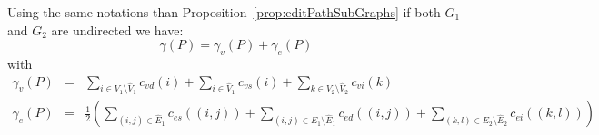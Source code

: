 \begin{remarque}\label{rem:doubleCounting}
  Using the same notations than
  Proposition~\ref{prop:editPathSubGraphs} if both $G_1$ and $G_2$ are
  undirected we have:
  \[
  \gamma(P)=\gamma_v(P)+\gamma_e(P)
  \]
  with
  \begin{equation*}
    \begin{array}{lcl}
      \gamma_v(P) & = & \displaystyle   \sum_{i\in V_1\setminus\hat{V}_1} c_{vd}(i)+
      \sum_{i\in \hat{V}_1} c_{vs}(i)+\sum_{k\in V_2\setminus\hat{V}_2} c_{vi}(k)\\
      \gamma_e(P)&=&\displaystyle\frac{1}{2}\left(\sum_{(i,j)\in \hat{E}_1} c_{es}((i,j)) +
                     \sum_{(i,j)\in E_1\setminus\hat{E}_1} c_{ed}((i,j))+\sum_{(k,l)\in E_2\setminus\hat{E}_2} c_{ei}((k,l))\right)\\
    \end{array}
  \end{equation*} 
\end{remarque}


